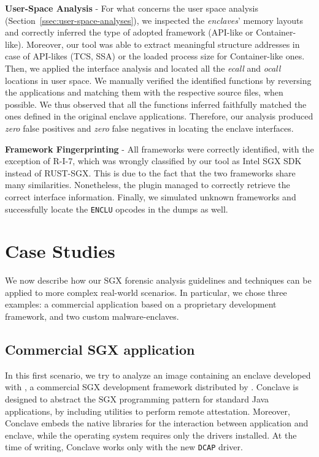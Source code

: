\noindent
\textbf{User-Space Analysis} - 
For what concerns the user space analysis 
(Section~\ref{ssec:user-space-analyses}), 
we inspected the \emph{enclaves}' memory layouts and correctly inferred the 
type of adopted framework (\ie API-like or Container-like).
Moreover, our tool was able to extract meaningful structure addresses in case 
of API-likes (\eg TCS, SSA) or the loaded process size for Container-like ones.
Then, we applied the interface analysis and located all the \emph{ecall} and 
\emph{ocall} locations in user space.
We manually verified the identified functions by reversing the applications and 
matching them with the respective source files, when possible.
We thus observed that all the functions inferred faithfully matched the
ones defined in the original enclave applications. 
Therefore, our analysis produced \emph{zero} false
positives and \emph{zero} false negatives in locating the enclave interfaces.

\noindent
\textbf{Framework Fingerprinting} - All frameworks were correctly identified,
with the exception of R-I-7, which was wrongly  
classified by our tool as Intel SGX SDK instead of RUST-SGX.
This is due to the fact that the two frameworks share many similarities.
Nonetheless, the plugin managed to correctly retrieve the correct interface 
information.
Finally, we simulated unknown frameworks and successfully locate the 
\texttt{ENCLU} opcodes in the dumps as well.

\section{Case Studies}

We now describe how our SGX forensic analysis guidelines and techniques can
be applied to more complex real-world scenarios.
In particular, we chose three examples: a commercial
application based on a proprietary development framework, and two custom 
malware-enclaves.

\subsection{Commercial SGX application}
\label{ssec:real-product-use-case}

In this first scenario, we try to analyze an image containing an enclave
developed with \cite{conclave}, a commercial SGX development framework 
distributed by \cite{r3}.
Conclave is designed to abstract the SGX programming pattern for standard
Java applications, \eg by including utilities to perform remote attestation.
Moreover, Conclave embeds the native libraries for the interaction between
application and enclave, while the operating system requires only the drivers
installed.
At the time of writing, Conclave works only with the new \texttt{DCAP} driver.

